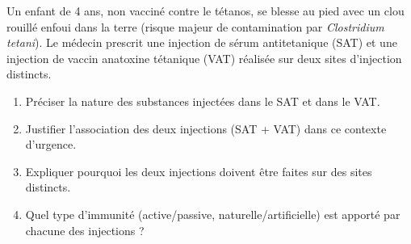 \documentclass[11pt]{article}
\begin{document}
\begin{exercice}
Un enfant de 4 ans, non vacciné contre le tétanos, se blesse au pied avec un clou rouillé enfoui dans la terre (risque majeur de contamination par \emph{Clostridium tetani}). Le médecin prescrit une injection de sérum antitetanique (SAT) et une injection de vaccin anatoxine tétanique (VAT) réalisée sur deux sites d'injection distincts.
\begin{enumerate}
    \item Préciser la nature des substances injectées dans le SAT et dans le VAT.
    \item Justifier l'association des deux injections (SAT + VAT) dans ce contexte d'urgence.
    \item Expliquer pourquoi les deux injections doivent être faites sur des sites distincts.
    \item Quel type d'immunité (active/passive, naturelle/artificielle) est apporté par chacune des injections ?
\end{enumerate}
\end{exercice}
\end{document}
